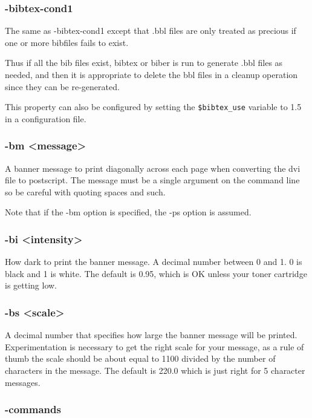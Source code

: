 \subsubsection{-bibtex-cond1}

The same as  -bibtex-cond1  except  that  .bbl  files  are  only
treated as precious if one or more bibfiles fails to exist.

Thus  if all the bib files exist, bibtex or biber is run to generate .bbl
files as needed, and then it is appropriate to delete the bbl files in a
cleanup operation since they can be re-generated.

This property can also be configured by setting the  \verb|$bibtex_use|
variable to 1.5 in a configuration file.


\subsubsection{-bm <message>}

A  banner message to print diagonally across each page when converting the dvi
file to postscript.  The message must be a  single argument on the command line
so be careful with quoting spaces and such.

Note that if the -bm option is specified, the -ps option is  assumed.


\subsubsection{-bi <intensity>}

How  dark to print the banner message.  A decimal number between
0 and 1.  0 is black and 1 is white.  The default is 0.95, which
is OK unless your toner cartridge is getting low.

\subsubsection{-bs <scale>}

A  decimal  number  that  specifies how large the banner message will be
printed.  Experimentation is necessary to get the  right scale  for  your
message, as a rule of thumb the scale should be about equal to 1100 divided by
the number of characters  in  the message.  The default is 220.0 which is just
right for 5 character messages.


\subsubsection{-commands}

